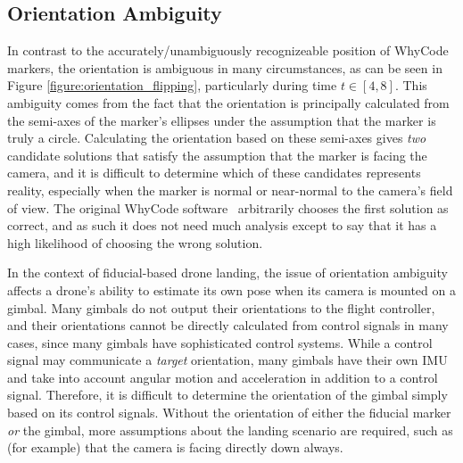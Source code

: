 \subsection{Orientation Ambiguity}

In contrast to the accurately/unambiguously recognizeable position of WhyCode markers, the orientation
is ambiguous in many circumstances, as can be seen in Figure \ref{figure:orientation_flipping},
particularly during time $t \in [4,8]$.
This ambiguity comes from the fact that the orientation is principally calculated from the semi-axes of the
marker's ellipses under the assumption that the marker is truly a circle.
Calculating the orientation based on these semi-axes gives \textit{two} candidate solutions
that satisfy the assumption that the marker is facing the camera,
and it is difficult to determine which of these candidates represents reality,
especially when the marker is normal or near-normal to the camera's field of view.
The original WhyCode software~\cite{LCAS_whycon} arbitrarily chooses the first solution as correct,
and as such it does not need much analysis except to say that it has a high likelihood of choosing the wrong solution.

In the context of fiducial-based drone landing, the issue of orientation ambiguity affects a drone's ability to
estimate its own pose when its camera is mounted on a gimbal.
Many gimbals do not output their orientations to the flight controller, and their orientations cannot be directly
calculated from control signals in many cases, since many gimbals have sophisticated control systems.
While a control signal may communicate a \textit{target} orientation,
many gimbals have their own IMU and take into account angular motion and acceleration in addition to a control signal.
Therefore, it is difficult to determine the orientation of the gimbal simply based on its control signals.
Without the orientation of either the fiducial marker \textit{or} the gimbal, more assumptions about
the landing scenario are required, such as (for example) that the camera is facing directly down always.

